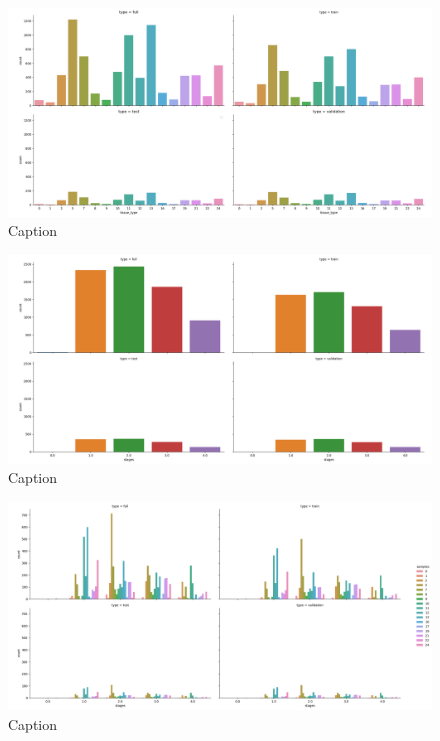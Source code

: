 \begin{figure}
    \centering
    \includegraphics[width=\linewidth]{images/split_tissue.png}
    \caption{Caption}
    \label{fig:split_tissue}
\end{figure}

\begin{figure}
    \centering
    \includegraphics[width=\linewidth]{images/split_stages.png}   
    \caption{Caption}
    \label{fig:split_stages}
\end{figure}

\begin{figure}
    \centering
    \includegraphics[width=\linewidth]{images/split_all.png}
    \caption{Caption}
    \label{fig:split_all}
\end{figure}

